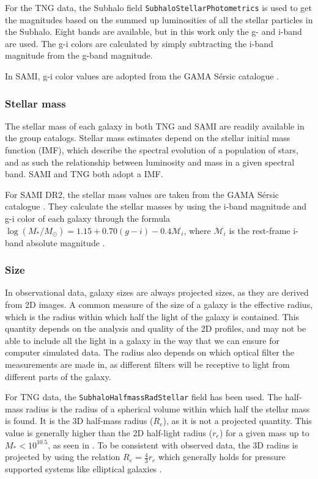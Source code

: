 For the TNG data, the Subhalo field \texttt{SubhaloStellarPhotometrics} is used to get the magnitudes based on the summed up luminosities of all the stellar particles in the Subhalo. Eight bands are available, but in this work only the g- and i-band are used. The g-i colors are calculated by simply subtracting the i-band magnitude from the g-band magnitude.

In SAMI, g-i color values are adopted from the GAMA Sérsic catalogue \parencite{Driver2011}.

\subsubsection{Stellar mass}
The stellar mass of each galaxy in both TNG and SAMI are readily available in the group catalogs. Stellar mass estimates depend on the stellar initial mass function (IMF), which describe the spectral evolution of a population of stars, and as such the relationship between luminosity and mass in a given spectral band. SAMI and TNG both adopt a \textcite{Chabrier2003} IMF.

For SAMI DR2, the stellar mass values are taken from the GAMA Sérsic catalogue \parencite{Driver2011}. They calculate the stellar masses by using the i-band magnitude and g-i color of each galaxy through the formula $\log(M_*/M_\odot) = 1.15 + 0.70(g-i) -0.4\mathcal{M}_i$, where $\mathcal{M}_i$ is the rest-frame i-band absolute magnitude \parencite{Taylor2011}.

\subsubsection{Size}\label{radius}
In observational data, galaxy sizes are always projected sizes, as they are derived from 2D images. A common measure of the size of a galaxy is the effective radius, which is the radius within which half the light of the galaxy is contained. This quantity depends on the analysis and quality of the 2D profiles, and may not be able to include all the light in a galaxy in the way that we can ensure for computer simulated data. The radius also depends on which optical filter the measurements are made in, as different filters will be receptive to light from different parts of the galaxy.

For TNG data, the \texttt{SubhaloHalfmassRadStellar} field has been used. The half-mass radius is the radius of a spherical volume within which half the stellar mass is found. It is the 3D half-mass radius ($R_e$), as it is not a projected quantity. This value is generally higher than the 2D half-light radius ($r_e$) for a given mass up to $M_{*} < 10^{10.5}$, as seen in \textcite{Genel2017}. To be consistent with observed data, the 3D radius is projected by using the relation $R_{e} = \frac{4}{3}r_{e}$ which generally holds for pressure supported systems like elliptical galaxies \parencite{Wolf2010}.

